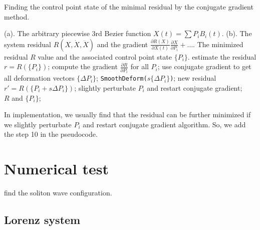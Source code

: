 \documentclass[12pt]{article}
\begin{document}
\begin{algorithm}[H]
	\renewcommand{\thealgorithm}{}
	\caption{Finding the control point state of the minimal residual by the conjugate gradient method.}
	\begin{algorithmic}[1]
		\Require 
		(a). The arbitrary piecewise 3rd Bezier function $X(t)=\sum P_i B_i(t)$. \qquad\qquad  (b). The system residual $R(X,\dot{X},\ddot{X})$ and the gradient $\frac{\partial R(X)}{\partial X(t)}\frac{\partial X}{\partial P_i} + \dots$.
		\Ensure
		The minimized residual $R$ value and the associated control point state $\{P_i\}$. \vspace{2mm}
		\Repeat
			\State estimate the residual $r=R(\{P_i\})$;
        	\State compute the gradient $\frac{\partial R}{\partial P_i}$ for all $P_i$;	
			\State use conjugate gradient to get all deformation vectors $\{\Delta P_i\}$;
				\State \texttt{SmoothDeform($s \{\Delta P_i\}$)};		
				\State new residual $r'=R(\{P_i + s \Delta P_i\})$;		
		  	\EndWhile
			  \State slightly perturbate $P_i$ and restart conjugate gradient;
			\EndIf
		 \\
		\Return $R$ and $\{P_i\}$;
	\end{algorithmic}
\end{algorithm}
%
In implementation, we usually find that the residual can be further minimized if we slightly perturbate $P_i$ and restart conjugate gradient algorithm.
So, we add the step 10 in the pseudocode.






\section{Numerical test}


find the soliton wave configuration.





\subsection{Lorenz system}
\end{document}
